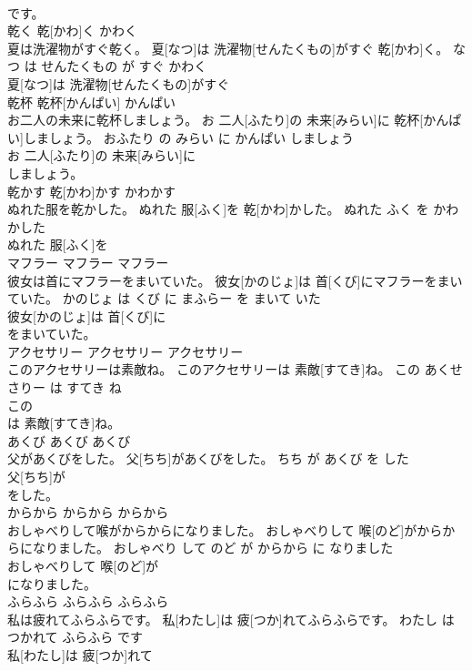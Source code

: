 \documentclass[8pt]{extreport}
\begin{document}
\begin{CJK}{UTF8}{min}
\\	です。			
\\	乾く	乾[かわ]く	かわく	
\\	夏は洗濯物がすぐ乾く。	夏[なつ]は 洗濯物[せんたくもの]がすぐ 乾[かわ]く。	なつ は せんたくもの が すぐ かわく	
\\	夏[なつ]は 洗濯物[せんたくもの]がすぐ
\\	乾杯	乾杯[かんぱい]	かんぱい	
\\	お二人の未来に乾杯しましょう。	お 二人[ふたり]の 未来[みらい]に 乾杯[かんぱい]しましょう。	おふたり の みらい に かんぱい しましょう	
\\	お 二人[ふたり]の 未来[みらい]に
\\	しましょう。			
\\	乾かす	乾[かわ]かす	かわかす	
\\	ぬれた服を乾かした。	ぬれた 服[ふく]を 乾[かわ]かした。	ぬれた ふく を かわかした	
\\	ぬれた 服[ふく]を
\\	マフラー	マフラー	マフラー	
\\	彼女は首にマフラーをまいていた。	彼女[かのじょ]は 首[くび]にマフラーをまいていた。	かのじょ は くび に まふらー を まいて いた	
\\	彼女[かのじょ]は 首[くび]に
\\	をまいていた。			
\\	アクセサリー	アクセサリー	アクセサリー	
\\	このアクセサリーは素敵ね。	このアクセサリーは 素敵[すてき]ね。	この あくせさりー は すてき ね	
\\	この
\\	は 素敵[すてき]ね。			
\\	あくび	あくび	あくび	
\\	父があくびをした。	父[ちち]があくびをした。	ちち が あくび を した	
\\	父[ちち]が
\\	をした。			
\\	からから	からから	からから	
\\	おしゃべりして喉がからからになりました。	おしゃべりして 喉[のど]がからからになりました。	おしゃべり して のど が からから に なりました	
\\	おしゃべりして 喉[のど]が
\\	になりました。			
\\	ふらふら	ふらふら	ふらふら	
\\	私は疲れてふらふらです。	私[わたし]は 疲[つか]れてふらふらです。	わたし は つかれて ふらふら です	
\\	私[わたし]は 疲[つか]れて

\end{CJK}
\end{document}
